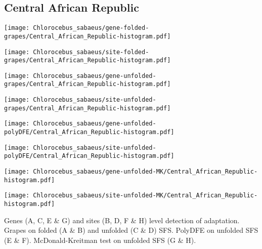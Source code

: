 \documentclass{article}
\begin{document}
\subsection{Central African Republic}
\centering
\begin{minipage}{0.49\linewidth}
    \texttt{[image: Chlorocebus\_sabaeus/gene-folded-grapes/Central\_African\_Republic-histogram.pdf]}
\end{minipage}%
\hfill
\begin{minipage}{0.49\linewidth}
    \texttt{[image: Chlorocebus\_sabaeus/site-folded-grapes/Central\_African\_Republic-histogram.pdf]}
\end{minipage}
\hfill
\begin{minipage}{0.49\linewidth}
    \texttt{[image: Chlorocebus\_sabaeus/gene-unfolded-grapes/Central\_African\_Republic-histogram.pdf]}
\end{minipage}%
\hfill
\begin{minipage}{0.49\linewidth}
    \texttt{[image: Chlorocebus\_sabaeus/site-unfolded-grapes/Central\_African\_Republic-histogram.pdf]}
\end{minipage}
\hfill
\begin{minipage}{0.49\linewidth}
    \texttt{[image: Chlorocebus\_sabaeus/gene-unfolded-polyDFE/Central\_African\_Republic-histogram.pdf]}
\end{minipage}%
\hfill
\begin{minipage}{0.49\linewidth}
    \texttt{[image: Chlorocebus\_sabaeus/site-unfolded-polyDFE/Central\_African\_Republic-histogram.pdf]}
\end{minipage}
\hfill
\begin{minipage}{0.49\linewidth}
    \texttt{[image: Chlorocebus\_sabaeus/gene-unfolded-MK/Central\_African\_Republic-histogram.pdf]}
\end{minipage}%
\hfill
\begin{minipage}{0.49\linewidth}
    \texttt{[image: Chlorocebus\_sabaeus/site-unfolded-MK/Central\_African\_Republic-histogram.pdf]}
\end{minipage}
\hfill
\flushleft
Genes (A, C, E \& G) and sites (B, D, F \& H) level detection of adaptation.
Grapes on folded (A \& B) and unfolded (C \& D) SFS.
PolyDFE on unfolded SFS (E \& F).
McDonald-Kreitman test on unfolded SFS (G \& H).
\end{document}
